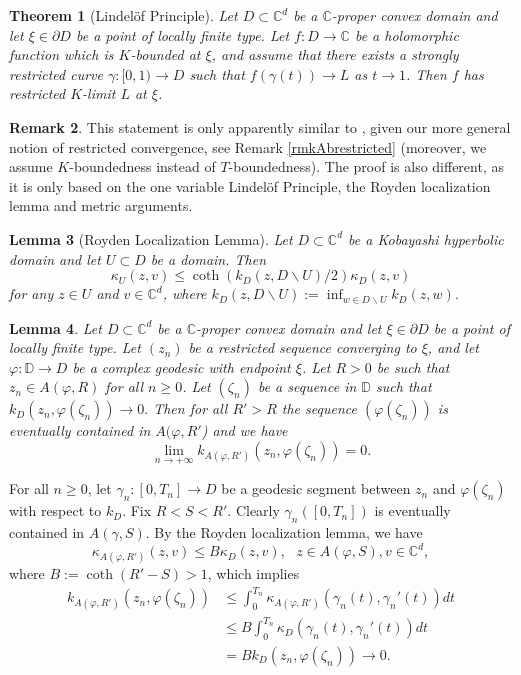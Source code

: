 \documentclass[11pt, reqno]{amsart}
\numberwithin{equation}{section}
\newtheorem{theorem}{Theorem}[section]
\newtheorem{lemma}[theorem]{Lemma}
\theoremstyle{definition}
\newtheorem{remark}[theorem]{Remark}
\newcommand{\C}{\mathbb{C}}
\newcommand{\D}{\mathbb{D}}
\begin{document}
{{{		
		
		
		
		\begin{theorem}[Lindel\"{o}f Principle]\label{localLindelof}
			Let $D\subset\C^d$ be a $\C$-proper  convex domain and let $\xi\in\partial D$ be a point of locally finite type. Let $f\colon D\to \C$  be a holomorphic function which is $K$-bounded at $\xi$, and assume that there exists a strongly restricted curve $\gamma\colon[0,1)\to D$  such that $f(\gamma(t))\to L$ as $t\to 1$. Then $f$ has restricted $K$-limit $L$ at $\xi$.
		\end{theorem}
		\begin{remark}
			This statement is only apparently similar to \cite[Theorem 3.2]{AbTau}, given our more general notion of restricted convergence, see Remark \ref{rmkAbrestricted} (moreover, we assume $K$-boundedness instead of $T$-boundedness).
			The proof is also different, as it is only based  on the one variable Lindel\"{o}f Principle, the Royden localization lemma  and metric  arguments. 
		\end{remark}
		
		
		
		
		
		
		
		\begin{lemma}[Royden Localization Lemma]\cite{RoyLocL}
			Let $D\subset\C^d$ be a Kobayashi hyperbolic domain and let $U\subset D$ be a domain. Then
			$$\kappa_{U}(z,v)\leq \coth(k_D(z,D\backslash U)/2) \kappa_D(z,v)$$
			for any $z\in U$ and $v\in\C^d$, where $k_D(z,D\backslash U):=\inf_{w\in D\backslash U}k_D(z,w)$.
		\end{lemma}
		
		\begin{lemma}\label{goodprodev}
			Let $D\subset\C^d$ be a $\C$-proper convex domain and let $\xi\in\partial D$ be a point of locally finite type.
			Let $(z_n)$ be a restricted sequence converging to $\xi$, and let $\varphi\colon \D\to D$ be a complex geodesic with endpoint $\xi$. Let $R>0$ be such that  $z_n\in A(\varphi,R)$ for all $n\geq 0$.
			Let  $(\zeta_n)$ be a sequence in $\D$ such that 
			$k_D(z_n,\varphi(\zeta_n))\to 0.$ Then for all $R'>R$ the sequence $(\varphi(\zeta_n))$ is eventually contained in $A(\varphi,R'$) and we have
			$$\lim_{n\to+\infty}k_{A(\varphi,R')}(z_n,\varphi(\zeta_n))=0.$$
		\end{lemma}
		\proof
		For all $n\geq 0$, let $\gamma_n\colon[0,T_n]\to D$ be a geodesic segment between $z_n$ and $\varphi(\zeta_n)$ with respect to $k_D$. 
		Fix $R<S<R'$. Clearly $\gamma_n([0,T_n])$ is eventually contained in  $A(\gamma,S)$.
		By the Royden localization lemma, we have
		$$\kappa_{A(\varphi,R')}(z,v)\leq B\kappa_{D}(z,v), \ \ \  z\in A(\varphi,S), v\in\C^d,$$
		where $B:=\coth(R'-S)>1$, which implies
		\begin{align*}k_{A(\varphi,R')}(z_n,\varphi(\zeta_n))&\leq \int_0^{T_n} \kappa_{A(\varphi,R')}(\gamma_n(t),\gamma_n'(t))dt\\&\leq B\int_0^{T_n} \kappa_{D}(\gamma_n(t),\gamma_n'(t))dt\\&= Bk_D(z_n,\varphi(\zeta_n))\to0.
		\end{align*}
		\endproof
		
}}}
\end{document}
